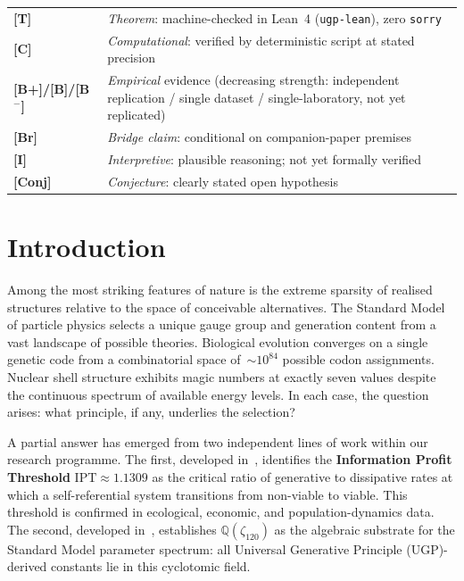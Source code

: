 \documentclass[11pt]{article}
\theoremstyle{remark}
\newcommand{\IPT}{\mathrm{IPT}}
\newcommand{\zetaN}[1]{\zeta_{#1}}
\begin{document}
\tableofcontents

\bigskip
\begin{tcolorbox}[colback=blue!4,colframe=blue!45!black,
                  title={Claim Status Taxonomy (used throughout this paper)}]
\small
\begin{tabular}{@{}lp{9cm}@{}}
\textbf{[T]}~~ & \textit{Theorem}: machine-checked in Lean~4 (\texttt{ugp-lean}), zero \texttt{sorry} \\[2pt]
\textbf{[C]}~~ & \textit{Computational}: verified by deterministic script at stated precision \\[2pt]
\textbf{[B+]/[B]/[B$^-$]} & \textit{Empirical} evidence (decreasing strength: independent replication / single dataset / single-laboratory, not yet replicated) \\[2pt]
\textbf{[Br]}~ & \textit{Bridge claim}: conditional on companion-paper premises \\[2pt]
\textbf{[I]}~~ & \textit{Interpretive}: plausible reasoning; not yet formally verified \\[2pt]
\textbf{[Conj]} & \textit{Conjecture}: clearly stated open hypothesis \\
\end{tabular}
\end{tcolorbox}

\section{Introduction}

Among the most striking features of nature is the extreme sparsity of realised
structures relative to the space of conceivable alternatives.
The Standard Model of particle physics selects a unique gauge group and generation
content from a vast landscape of possible theories.
Biological evolution converges on a single genetic code from a combinatorial space
of~$\sim 10^{84}$ possible codon assignments.
Nuclear shell structure exhibits magic numbers at exactly seven values despite the
continuous spectrum of available energy levels.
In each case, the question arises: what principle, if any, underlies the selection?

A partial answer has emerged from two independent lines of work within our research
programme.
The first, developed in~\cite{SpivackIPT}, identifies the \textbf{Information Profit
Threshold} $\IPT \approx 1.1309$ as the critical ratio of generative to dissipative rates at
which a self-referential system transitions from non-viable to viable.
This threshold is confirmed in ecological, economic, and population-dynamics data.
The second, developed in~\cite{Spivack2026_SM_UGP}, establishes
$\mathbb{Q}(\zetaN{120})$ as the algebraic substrate for the Standard Model
parameter spectrum: all Universal Generative Principle (UGP)-derived constants lie in this cyclotomic field.
\end{document}
